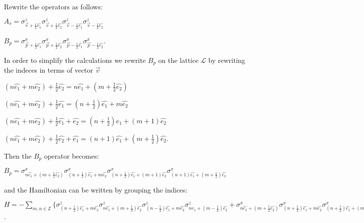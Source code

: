 \documentclass{Configuration_Files/PoliMi3i_thesis}
\begin{document}
Rewrite the operators as follows: \newline

\begin{center}
	
	$A_{v} = \sigma^z_{\vec{v}+\frac{1}{2}\hat{e_1}} \sigma^z_{\vec{v}+\frac{1}{2}\hat{e_2}} \sigma^z_{\vec{v}-\frac{1}{2}\hat{e_1}} \sigma^z_{\vec{v}-\frac{1}{2}\hat{e_2}}$ 
	
	$B_{p} = \sigma^x_{\vec{p}+\frac{1}{2}\hat{e_1}} \sigma^x_{\vec{p}+\frac{1}{2}\hat{e_2}} \sigma^x_{\vec{p}-\frac{1}{2}\hat{e_1}} \sigma^x_{\vec{p}-\frac{1}{2}\hat{e_2}}$.
	
\end{center}

In order to simplify the calculations we rewrite $B_p$ on the lattice $\mathcal{L}$ by rewriting the indeces in terms of vector $\vec{v}$ \newline

\begin{center}
	$(n\hat{e_1} + m\hat{e_2}) + \frac{1}{2}\hat{e_2}= n\hat{e_1} + (m+\frac{1}{2}\hat{e_2})$
	
	$(n\hat{e_1} + m\hat{e_2}) + \frac{1}{2}\hat{e_1}= (n+ \frac{1}{2})\hat{e_1} + m\hat{e_2}$
	
	$(n\hat{e_1} + m\hat{e_2}) + \frac{1}{2}\hat{e_1}+\hat{e_2}= (n+ \frac{1}{2})\hat{e_1} + (m + 1)\hat{e_2}$
	
	$(n\hat{e_1} + m\hat{e_2}) + \frac{1}{2}\hat{e_2}+\hat{e_1}= (n+ 1)\hat{e_1} + (m + \frac{1}{2})\hat{e_2}$.
\end{center}


Then the $B_{p}$ operator becomes: \newline

\begin{center}
	
	$B_{p} = \sigma^x_{n\hat{e_1} + (m+\frac{1}{2}\hat{e_2})} \sigma^x_{(n+ \frac{1}{2})\hat{e_1} + m\hat{e_2}} \sigma^x_{(n+ \frac{1}{2})\hat{e_1} + (m + 1)\hat{e_2}} \sigma^x_{(n+ 1)\hat{e_1} + (m + \frac{1}{2})\hat{e_2}}$ \newline
	
\end{center}

and the Hamiltonian can be written by grouping the indices: \newline

\begin{center}
	
	$H = - \sum_{m,n \in \mathbb{Z}} \{ 
	\sigma^z_{(n+\frac{1}{2})\hat{e_1} + m\hat{e_2}} \sigma^z_{n\hat{e_1}+(m+\frac{1}{2})\hat{e_2}} \sigma^z_{(n-\frac{1}{2})\hat{e_1} + m\hat{e_2}} \sigma^z_{n\hat{e_1}+(m-\frac{1}{2})\hat{e_2}} +
	\sigma^x_{n\hat{e_1} + (m+\frac{1}{2}\hat{e_2})} \sigma^x_{(n+ \frac{1}{2})\hat{e_1} + m\hat{e_2}} \sigma^x_{(n+ \frac{1}{2})\hat{e_1} + (m + 1)\hat{e_2}} \sigma^x_{(n+ 1)\hat{e_1} + (m + \frac{1}{2})\hat{e_2}} \} $.\newline
	
\end{center}
\end{document}

